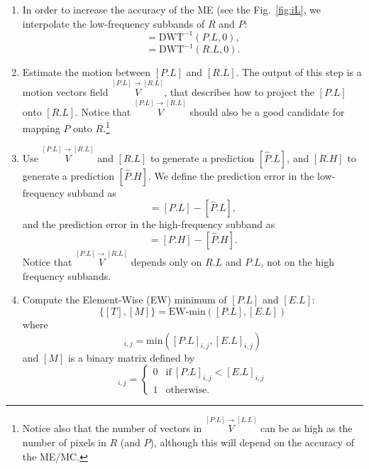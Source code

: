 \begin{enumerate}

\item In order to increase the accuracy of the ME (see the
  Fig.~\ref{fig:iL}, we interpolate the low-frequency subbands of $R$
  and $P$:
  \begin{equation}
    [P.L] = \text{DWT}^{-1}(P.L, 0),
  \end{equation}
  \begin{equation}
    [R.L] = \text{DWT}^{-1}(R.L, 0).
  \end{equation}

\item Estimate the motion between $[P.L]$ and $[R.L]$.
  The output of this step is a motion vectors field
  $\overset{[P.L]\rightarrow [R.L]}{V}$, that describes how to project
  the $[P.L]$ onto $[R.L]$. Notice that $\overset{[P.L]\rightarrow
  [R.L]}{V}$ should also be a good candidate for mapping $P$ onto
  $R$.\footnote{Notice also that the number of vectors in
  $\overset{[P.L]\rightarrow [L.L]}{V}$ can be as high as the number
  of pixels in $R$ (and $P$), although this will depend on the
  accuracy of the ME/MC.}
  
\item Use $\overset{[P.L]\rightarrow [R.L]}{V}$ and $[R.L]$ to
  generate a prediction $[\hat{P}.L]$, and $[R.H]$ to generate a
  prediction $[\hat{P}.H]$. We define the prediction error in the
  low-frequency subband as
  \begin{equation}
    [E.L] = [P.L] - [\hat{P}.L],
    \label{eq:prediction_error_L}
  \end{equation}
  and the prediction error in the high-frequency subband
  as
  \begin{equation}
    [E.H] = [P.H] - [\hat{P}.H].
    \label{eq:prediction_error}
  \end{equation}
  Notice that $\overset{[P.L]\rightarrow [R.L]}{V}$ depends only on
  $R.L$ and $P.L$, not on the high frequency subbands.

\item Compute the Element-Wise (EW) minimum of $[P.L]$ and $[E.L]$:
  \begin{equation}
    \{[T],[M]\} = \text{EW-min}([P.L], [E.L])
    \label{eq:EW-min}
  \end{equation}
  where
  \begin{equation}
    [T]_{i,j}=\text{min}([P.L]_{i,j}, [E.L]_{i,j})
  \end{equation}
  and $[M]$ is a binary matrix defined by
  \begin{equation}
    [M]_{i,j} = \left\{
      \begin{array}{ll}
        0 & \text{if}~[P.L]_{i,j} < [E.L]_{i,j} \\
        1 & \text{otherwise}.
      \end{array}
    \right.
    \label{eq:matrix}
  \end{equation}
  

\end{enumerate}
